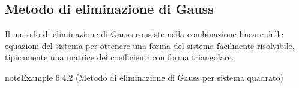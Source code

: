 \documentclass[letterpaper,10pt,italian]{jupyterBook}
\begin{document}
\subsection{Metodo di eliminazione di Gauss}
\label{\detokenize{ch/algebra/linear-algebra:metodo-di-eliminazione-di-gauss}}\label{\detokenize{ch/algebra/linear-algebra:math-hs-algebra-linear-linear-system-sol-gauss}}
\sphinxAtStartPar
Il metodo di eliminazione di Gauss consiste nella combinazione lineare delle equazioni del sistema per ottenere una forma del sistema facilmente risolvibile, tipicamente una matrice dei coefficienti con forma triangolare.
\label{ch/algebra/linear-algebra:linsys-gauss}
\begin{sphinxadmonition}{note}{Example 6.4.2 (Metodo di eliminazione di Gauss per sistema quadrato)}




\end{sphinxadmonition}
\end{document}
